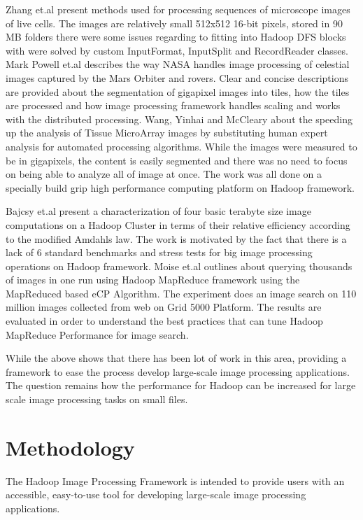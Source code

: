 \documentclass[conference]{IEEEtran}
\begin{document}
Zhang et.al \cite{Zhang2010} present methods used for processing sequences of microscope images of live cells. The images are relatively small 512x512 16-bit pixels, stored in 90 MB folders there were some issues regarding to fitting into Hadoop DFS blocks with were solved by custom InputFormat, InputSplit and RecordReader classes. Mark Powell et.al \cite{Powell2010} describes the way NASA handles image processing of celestial images captured by the Mars Orbiter and rovers. Clear and concise descriptions are provided about the segmentation of gigapixel images into tiles, how the tiles are processed and how image processing framework handles scaling and works with the distributed processing. Wang, Yinhai and McCleary\cite{Wang2011} about the speeding up the analysis of Tissue MicroArray images by substituting human expert analysis for automated processing algorithms. While the images were measured to be in gigapixels, the content is easily segmented and there was no need to focus on being able to analyze all of image at once. The work was all done on a specially build grip high performance	computing platform on Hadoop framework. 

Bajcsy et.al \cite{Bajcsy2013} present a characterization of four basic terabyte size image computations on a Hadoop Cluster in terms of their relative efficiency according to the modified Amdahls law. The work is motivated by the fact that there is a lack of 6 standard benchmarks and stress tests for big image processing operations on Hadoop framework. Moise et.al \cite{Moise2013} outlines about querying thousands of images in one run using Hadoop MapReduce framework using the MapReduced based eCP Algorithm. The experiment does an image search on 110 million images collected from web on Grid 5000 Platform. The results are evaluated in order to understand the best practices that can tune Hadoop MapReduce Performance for image search.	

While the above shows that there has been lot of work in this area, providing a framework to ease the process develop large-scale image processing applications. The question remains how the performance for Hadoop can be increased for large scale image processing tasks on small files.
	
\section{Methodology}
\label{methodology}
The Hadoop Image Processing Framework is intended to provide users
with an accessible, easy-to-use tool for developing large-scale image
processing applications.
\end{document}
